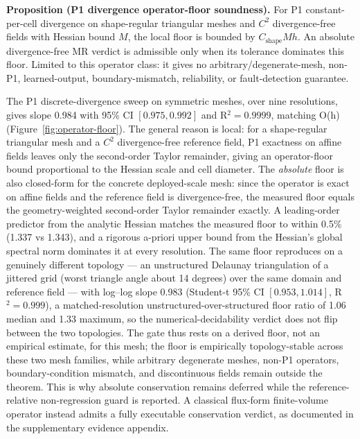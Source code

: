 \documentclass[preprint,12pt]{elsarticle}
\begin{document}
\noindent\begin{minipage}{\linewidth}
\textbf{Proposition (P1 divergence operator-floor soundness).}
For P1 constant-per-cell divergence on shape-regular triangular meshes and
$C^2$ divergence-free fields with Hessian bound $M$, the local floor is bounded
by $C_{\mathrm{shape}}Mh$. An absolute divergence-free MR verdict is admissible
only when its tolerance dominates this floor. Limited to this operator class:
it gives no arbitrary/degenerate-mesh, non-P1, learned-output,
boundary-mismatch, reliability, or fault-detection guarantee.
\end{minipage}
\medskip

The P1 discrete-divergence sweep on symmetric meshes, over nine resolutions, gives slope 0.984 with 95\% CI $[0.975, 0.992]$ and R$^2=0.9999$, matching O(h) (Figure~\ref{fig:operator-floor}). The general reason is local: for a shape-regular triangular mesh and a $C^2$ divergence-free reference field, P1 exactness on affine fields leaves only the second-order Taylor remainder, giving an operator-floor bound proportional to the Hessian scale and cell diameter. The \emph{absolute} floor is also closed-form for the concrete deployed-scale mesh: since the operator is exact on affine fields and the reference field is divergence-free, the measured floor equals the geometry-weighted second-order Taylor remainder exactly. A leading-order predictor from the analytic Hessian matches the measured floor to within 0.5\% (1.337 vs 1.343), and a rigorous a-priori upper bound from the Hessian's global spectral norm dominates it at every resolution. The same floor reproduces on a genuinely different topology --- an unstructured Delaunay triangulation of a jittered grid (worst triangle angle about 14 degrees) over the same domain and reference field --- with log--log slope 0.983 (Student-t 95\% CI $[0.953, 1.014]$, R$^2=0.999$), a matched-resolution unstructured-over-structured floor ratio of 1.06 median and 1.33 maximum, so the numerical-decidability verdict does not flip between the two topologies. The gate thus rests on a derived floor, not an empirical estimate, for this mesh; the floor is empirically topology-stable across these two mesh families, while arbitrary degenerate meshes, non-P1 operators, boundary-condition mismatch, and discontinuous fields remain outside the theorem. This is why absolute conservation remains deferred while the reference-relative non-regression guard is reported. A classical flux-form finite-volume operator instead admits a fully executable conservation verdict, as documented in the supplementary evidence appendix.
\end{document}

